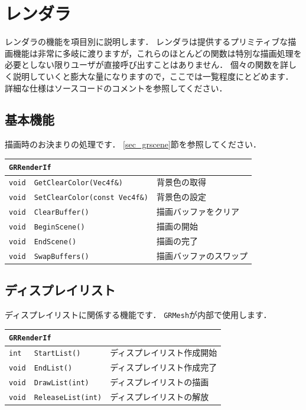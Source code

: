 \section{\KLUDGE レンダラ}

\KLUDGE レンダラの機能を項目別に説明します．
\KLUDGE レンダラは提供するプリミティブな描画機能は非常に多岐に渡りますが，これらのほとんどの関数は特別な描画処理を必要としない限りユーザが直接呼び出すことはありません．
\KLUDGE 個々の関数を詳しく説明していくと膨大な量になりますので，ここでは一覧程度にとどめます．
\KLUDGE 詳細な仕様はソースコードのコメントを参照してください．

\subsection*{\KLUDGE 基本機能}

\KLUDGE 描画時のお決まりの処理です．
\ref{sec_grscene}\KLUDGE 節を参照してください．

\begin{center}
\begin{tabular}{p{.1\hsize}p{.45\hsize}p{.35\hsize}}
\multicolumn{2}{l}{\texttt{GRRenderIf}}									\\ \midrule
\texttt{void} & \texttt{GetClearColor(Vec4f\&)}			& \KLUDGE 背景色の取得				\\
\texttt{void} & \texttt{SetClearColor(const Vec4f\&)}	& \KLUDGE 背景色の設定				\\
\texttt{void} & \texttt{ClearBuffer()}					& \KLUDGE 描画バッファをクリア		\\
\texttt{void} & \texttt{BeginScene()}					& \KLUDGE 描画の開始				\\
\texttt{void} & \texttt{EndScene()}						& \KLUDGE 描画の完了				\\
\texttt{void} & \texttt{SwapBuffers()}					& \KLUDGE 描画バッファのスワップ	\\
\end{tabular}
\end{center}

\subsection*{\KLUDGE ディスプレイリスト}

\KLUDGE ディスプレイリストに関係する機能です．
\texttt{GRMesh}\KLUDGE が内部で使用します．

\begin{center}
\begin{tabular}{p{.1\hsize}p{.45\hsize}p{.35\hsize}}
\multicolumn{2}{l}{\texttt{GRRenderIf}}					\\ \midrule
\texttt{int}  & \texttt{StartList()}			& \KLUDGE ディスプレイリスト作成開始	\\
\texttt{void} & \texttt{EndList()}				& \KLUDGE ディスプレイリスト作成完了	\\
\texttt{void} & \texttt{DrawList(int)}			& \KLUDGE ディスプレイリストの描画		\\
\texttt{void} & \texttt{ReleaseList(int)}		& \KLUDGE ディスプレイリストの解放		\\
\end{tabular}
\end{center}

